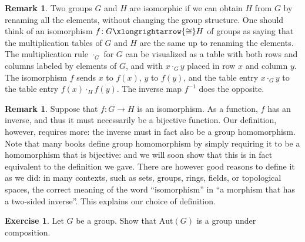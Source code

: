 \documentclass[12pt]{report}
\numberwithin{equation}{section}
\numberwithin{theorem}{chapter}
\theoremstyle{definition}
\newtheorem{exercise}{Exercise}
\newtheorem*{basic properties}{Basic Properties}
\newtheorem*{Important Remark}{Important Remark}
\newtheorem{remark}[theorem]{Remark}
\begin{document}
\begin{remark}
Two groups $G$ and $H$ are isomorphic if we can obtain $H$ from $G$ by renaming all the elements, without changing the group structure.
One should think of an isomorphism $f\!: G \xlongrightarrow{\cong} H$ of groups as saying that the multiplication tables of $G$ and $H$ are the same up to renaming the elements. The multiplication rule $\cdot_G$ for $G$ can be visualized as a table with both rows and columns labeled by elements of $G$, and with $x \cdot_G y$ placed in row $x$ and column $y$.
The isomorphism $f$ sends $x$ to $f(x)$, $y$ to $f(y)$, and the table entry $x \cdot_G y$ to the table entry $f(x) \cdot_H f(y)$. The inverse map $f^{-1}$ does the opposite.
\end{remark}



\begin{remark}\label{remark iso def}
	Suppose that $f\!: G \to H$ is an isomorphism. As a function, $f$ has an inverse, and thus it must necessarily be a bijective function. Our definition, however, requires more: the inverse must in fact also be a group homomorphism. Note that many books define group homomorphism by simply requiring it to be a homomorphism that is bijective: and we will soon show that this is in fact equivalent to the definition we gave. There are however good reasons to define it as we did: in many contexts, such as sets, groups, rings, fields, or topological spaces, the correct meaning of the word ``isomorphism'' in ``a morphism that has a two-sided inverse''. This explains our choice of definition.
\end{remark}



\begin{exercise}
	Let $G$ be a group. Show that $\mathrm{Aut}(G)$ is a group under composition.
\end{exercise}
\end{document}
